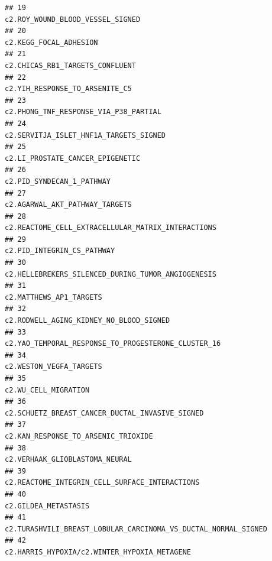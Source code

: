 \documentclass{article}\usepackage[]{graphicx}\usepackage[]{color}
\makeatletter
\newenvironment{kframe}{%
 \def\at@end@of@kframe{}%
 \ifinner\ifhmode%
  \def\at@end@of@kframe{\end{minipage}}%
  \begin{minipage}{\columnwidth}%
 \fi\fi%
 \def\FrameCommand##1{\hskip\@totalleftmargin \hskip-\fboxsep
 \colorbox{shadecolor}{##1}\hskip-\fboxsep
     \hskip-\linewidth \hskip-\@totalleftmargin \hskip\columnwidth}%
 \MakeFramed {\advance\hsize-\width
   \@totalleftmargin\z@ \linewidth\hsize
   \@setminipage}}%
 {\par\unskip\endMakeFramed%
 \at@end@of@kframe}
\newenvironment{knitrout}{}{} %
\makeatother
\begin{document}
\begin{knitrout}
\begin{kframe}
\begin{verbatim}
## 19                                                                       c2.ROY_WOUND_BLOOD_VESSEL_SIGNED
## 20                                                                                 c2.KEGG_FOCAL_ADHESION
## 21                                                                        c2.CHICAS_RB1_TARGETS_CONFLUENT
## 22                                                                         c2.YIH_RESPONSE_TO_ARSENITE_C5
## 23                                                                  c2.PHONG_TNF_RESPONSE_VIA_P38_PARTIAL
## 24                                                                 c2.SERVITJA_ISLET_HNF1A_TARGETS_SIGNED
## 25                                                                       c2.LI_PROSTATE_CANCER_EPIGENETIC
## 26                                                                              c2.PID_SYNDECAN_1_PATHWAY
## 27                                                                         c2.AGARWAL_AKT_PATHWAY_TARGETS
## 28                                                     c2.REACTOME_CELL_EXTRACELLULAR_MATRIX_INTERACTIONS
## 29                                                                             c2.PID_INTEGRIN_CS_PATHWAY
## 30                                                     c2.HELLEBREKERS_SILENCED_DURING_TUMOR_ANGIOGENESIS
## 31                                                                                c2.MATTHEWS_AP1_TARGETS
## 32                                                                c2.RODWELL_AGING_KIDNEY_NO_BLOOD_SIGNED
## 33                                                    c2.YAO_TEMPORAL_RESPONSE_TO_PROGESTERONE_CLUSTER_16
## 34                                                                                c2.WESTON_VEGFA_TARGETS
## 35                                                                                   c2.WU_CELL_MIGRATION
## 36                                                        c2.SCHUETZ_BREAST_CANCER_DUCTAL_INVASIVE_SIGNED
## 37                                                                    c2.KAN_RESPONSE_TO_ARSENIC_TRIOXIDE
## 38                                                                         c2.VERHAAK_GLIOBLASTOMA_NEURAL
## 39                                                         c2.REACTOME_INTEGRIN_CELL_SURFACE_INTERACTIONS
## 40                                                                                   c2.GILDEA_METASTASIS
## 41                                         c2.TURASHVILI_BREAST_LOBULAR_CARCINOMA_VS_DUCTAL_NORMAL_SIGNED
## 42                                                           c2.HARRIS_HYPOXIA/c2.WINTER_HYPOXIA_METAGENE

\end{verbatim}
\end{kframe}
\end{knitrout}
\end{document}
